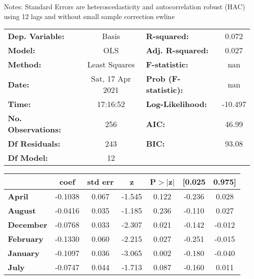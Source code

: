 Notes: \newline
 [1] Standard Errors are heteroscedasticity and autocorrelation robust (HAC) using 12 lags and without small sample correction
ewline\begin{center}
\begin{tabular}{lclc}
\toprule
\textbf{Dep. Variable:}    &      Basis       & \textbf{  R-squared:         } &     0.072   \\
\textbf{Model:}            &       OLS        & \textbf{  Adj. R-squared:    } &     0.027   \\
\textbf{Method:}           &  Least Squares   & \textbf{  F-statistic:       } &       nan   \\
\textbf{Date:}             & Sat, 17 Apr 2021 & \textbf{  Prob (F-statistic):} &      nan    \\
\textbf{Time:}             &     17:16:52     & \textbf{  Log-Likelihood:    } &   -10.497   \\
\textbf{No. Observations:} &         256      & \textbf{  AIC:               } &     46.99   \\
\textbf{Df Residuals:}     &         243      & \textbf{  BIC:               } &     93.08   \\
\textbf{Df Model:}         &          12      & \textbf{                     } &             \\
\bottomrule
\end{tabular}
\begin{tabular}{lcccccc}
                   & \textbf{coef} & \textbf{std err} & \textbf{z} & \textbf{P$> |$z$|$} & \textbf{[0.025} & \textbf{0.975]}  \\
\midrule
\textbf{April}     &      -0.1038  &        0.067     &    -1.545  &         0.122        &       -0.236    &        0.028     \\
\textbf{August}    &      -0.0416  &        0.035     &    -1.185  &         0.236        &       -0.110    &        0.027     \\
\textbf{December}  &      -0.0768  &        0.033     &    -2.307  &         0.021        &       -0.142    &       -0.012     \\
\textbf{February}  &      -0.1330  &        0.060     &    -2.215  &         0.027        &       -0.251    &       -0.015     \\
\textbf{January}   &      -0.1097  &        0.036     &    -3.065  &         0.002        &       -0.180    &       -0.040     \\
\textbf{July}      &      -0.0747  &        0.044     &    -1.713  &         0.087        &       -0.160    &        0.011     \\

\end{tabular}
\end{center}
